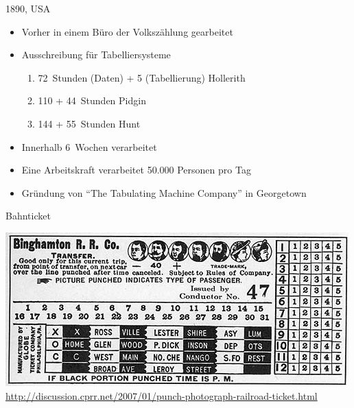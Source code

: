 \documentclass[EU2]{beamer}
\begin{document}
\begin{frame}{1890, USA}
  \begin{itemize}
    \item Vorher in einem Büro der Volkszählung gearbeitet
    \item Ausschreibung für Tabelliersysteme
      \begin{enumerate}
	\item 72~Stunden (Daten) + 5 (Tabellierung) Hollerith
	\item 110 + 44~Stunden Pidgin
	\item 144 + 55~Stunden Hunt
      \end{enumerate}
    \item Innerhalb 6~Wochen verarbeitet
    \item Eine Arbeitskraft verarbeitet 50.000 Personen pro Tag
    \item Gründung von \enquote{The Tabulating Machine Company} in Georgetown
  \end{itemize}
\end{frame}

\begin{frame}[plain]{Bahnticket}
  \begin{center}
    \includegraphics[width=\textwidth]{phototicket}\\
    \tiny{\url{http://discussion.cprr.net/2007/01/punch-photograph-railroad-ticket.html}}
  \end{center}
\end{frame}
\end{document}
